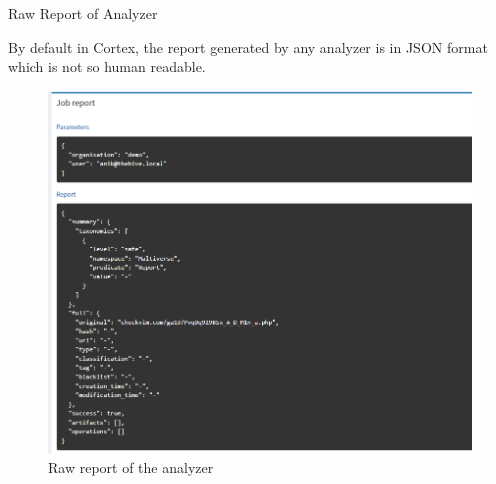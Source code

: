 \begin{frame}{Raw Report of Analyzer}

\begin{justify}
    By default in Cortex, the report generated by any analyzer is in JSON format which is not so human readable. 
\end{justify}

\begin{figure}[htp]
    \centering
    \includegraphics[scale = 0.25]{raw report.png}
    \caption{Raw report of the analyzer}
    \label{fig:raw-report}
\end{figure}
    
\end{frame}

